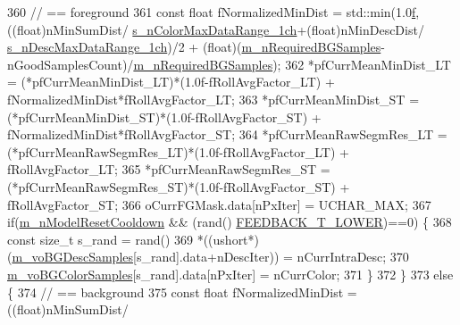 \begin{DoxyCode}
360                 \textcolor{comment}{// == foreground}
361                 \textcolor{keyword}{const} \textcolor{keywordtype}{float} fNormalizedMinDist = std::min(1.0\mbox{\hyperlink{rings_8cpp_a77369fc4d5326a16d2c603e032023528}{f}},((\textcolor{keywordtype}{float})nMinSumDist/
      \mbox{\hyperlink{_background_subtractor_su_b_s_e_n_s_e_8cpp_ad0ce3de05453a1b3738f711d9955031f}{s\_nColorMaxDataRange\_1ch}}+(\textcolor{keywordtype}{float})nMinDescDist/
      \mbox{\hyperlink{_background_subtractor_su_b_s_e_n_s_e_8cpp_a15305d6ff106cc0ab9f1b7cfb21a27c7}{s\_nDescMaxDataRange\_1ch}})/2 + (\textcolor{keywordtype}{float})(\mbox{\hyperlink{class_background_subtractor_su_b_s_e_n_s_e_aca07c4307021623f9055832506cad1d6}{m\_nRequiredBGSamples}}-
      nGoodSamplesCount)/\mbox{\hyperlink{class_background_subtractor_su_b_s_e_n_s_e_aca07c4307021623f9055832506cad1d6}{m\_nRequiredBGSamples}});
362                 *pfCurrMeanMinDist\_LT = (*pfCurrMeanMinDist\_LT)*(1.0f-fRollAvgFactor\_LT) + 
      fNormalizedMinDist*fRollAvgFactor\_LT;
363                 *pfCurrMeanMinDist\_ST = (*pfCurrMeanMinDist\_ST)*(1.0f-fRollAvgFactor\_ST) + 
      fNormalizedMinDist*fRollAvgFactor\_ST;
364                 *pfCurrMeanRawSegmRes\_LT = (*pfCurrMeanRawSegmRes\_LT)*(1.0f-fRollAvgFactor\_LT) + 
      fRollAvgFactor\_LT;
365                 *pfCurrMeanRawSegmRes\_ST = (*pfCurrMeanRawSegmRes\_ST)*(1.0f-fRollAvgFactor\_ST) + 
      fRollAvgFactor\_ST;
366                 oCurrFGMask.data[nPxIter] = UCHAR\_MAX;
367                 \textcolor{keywordflow}{if}(\mbox{\hyperlink{class_background_subtractor_l_b_s_p_a5ea18d388afacf8285c46ba0f754e7ee}{m\_nModelResetCooldown}} && (rand()%
      \mbox{\hyperlink{_background_subtractor_su_b_s_e_n_s_e_8cpp_a6975332215c62c3172a76af852bc5566}{FEEDBACK\_T\_LOWER}})==0) \{
368                     \textcolor{keyword}{const} \textcolor{keywordtype}{size\_t} s\_rand = rand()%
369                     *((ushort*)(\mbox{\hyperlink{class_background_subtractor_su_b_s_e_n_s_e_a422cc2f2a25c07efca02087bd6fe3d6d}{m\_voBGDescSamples}}[s\_rand].data+nDescIter)) = 
      nCurrIntraDesc;
370                     \mbox{\hyperlink{class_background_subtractor_su_b_s_e_n_s_e_a9d4d4bb930b34745536b9862683bb539}{m\_voBGColorSamples}}[s\_rand].data[nPxIter] = nCurrColor;
371                 \}
372             \}
373             \textcolor{keywordflow}{else} \{
374                 \textcolor{comment}{// == background}
375                 \textcolor{keyword}{const} \textcolor{keywordtype}{float} fNormalizedMinDist = ((float)nMinSumDist/

\end{DoxyCode}
